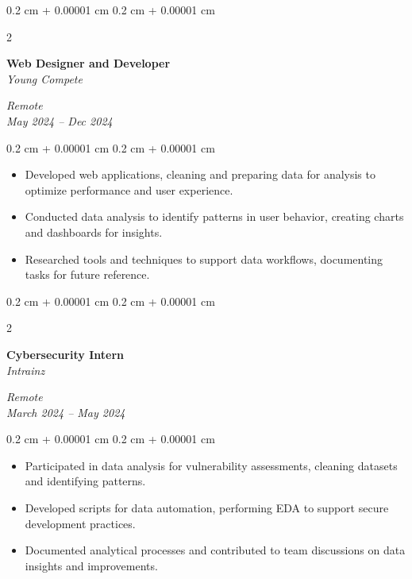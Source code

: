 \documentclass[10pt, letterpaper]{article}
\newenvironment{highlights}{
    \begin{itemize}[
        topsep=0.10 cm,
        parsep=0.10 cm,
        partopsep=0pt,
        itemsep=0pt,
        leftmargin=0.4 cm + 10pt
    ]
}{
    \end{itemize}
} %
\newenvironment{onecolentry}{
    \begin{adjustwidth}{
        0.2 cm + 0.00001 cm
    }{
        0.2 cm + 0.00001 cm
    }
}{
    \end{adjustwidth}
} %
\newenvironment{twocolentry}[2][]{
    \onecolentry
    \def\secondColumn{#2}
    \setcolumnwidth{\fill, 4.5 cm}
    \begin{paracol}{2}
}{
    \switchcolumn \raggedleft \secondColumn
    \end{paracol}
    \endonecolentry
} %
\begin{document}
    \vspace{0.2 cm}
    \begin{twocolentry}{
        \textit{Remote} \\
        \textit{May 2024 – Dec 2024}
    }
        \textbf{Web Designer and Developer} \\
        \textit{Young Compete}
    \end{twocolentry}
    \vspace{0.10 cm}
    \begin{onecolentry}
        \begin{highlights}
            \item Developed web applications, cleaning and preparing data for analysis to optimize performance and user experience.
            \item Conducted data analysis to identify patterns in user behavior, creating charts and dashboards for insights.
            \item Researched tools and techniques to support data workflows, documenting tasks for future reference.
        \end{highlights}
    \end{onecolentry}
    \vspace{0.2 cm}
    \begin{twocolentry}{
        \textit{Remote} \\
        \textit{March 2024 – May 2024}
    }
        \textbf{Cybersecurity Intern} \\
        \textit{Intrainz}
    \end{twocolentry}
    \vspace{0.10 cm}
    \begin{onecolentry}
        \begin{highlights}
            \item Participated in data analysis for vulnerability assessments, cleaning datasets and identifying patterns.
            \item Developed scripts for data automation, performing EDA to support secure development practices.
            \item Documented analytical processes and contributed to team discussions on data insights and improvements.
        \end{highlights}
    \end{onecolentry}
\end{document}
